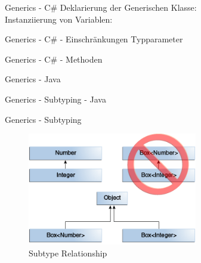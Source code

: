 \documentclass[11pt]{beamer}
\begin{document}

\begin{frame}{Generics - C\#}
	Deklarierung der Generischen Klasse: \\
	Instanziierung von Variablen: \\
\end{frame}

\begin{frame}{Generics - C\# - Einschränkungen Typparameter}
\end{frame}

\begin{frame}{Generics - C\# - Methoden}
\end{frame}


\begin{frame}{Generics - Java}
\end{frame}

\begin{frame}{Generics - Subtyping - Java}
\end{frame}

\begin{frame}{Generics - Subtyping}
	\begin{figure}
			\includegraphics[width=0.66\textwidth]{bilder/generics-subtypeRelationship.png}
			\caption{Subtype Relationship \cite{java_generics_inheritance}}
	\end{figure}
\end{frame}
\end{document}
